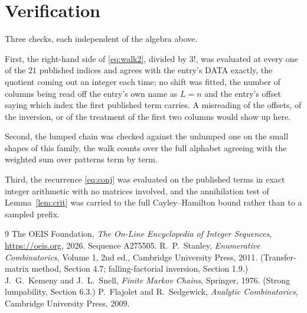 \documentclass[11pt,a4paper]{article}
\theoremstyle{plain}
\theoremstyle{definition}
\begin{document}
\section{Verification}

Three checks, each independent of the algebra above.

First, the right-hand side of \eqref{eq:walk2}, divided by $3!$, was evaluated at every
one of the $21$ published indices and agrees with the entry's DATA exactly, the quotient
coming out an integer each time; no shift was fitted, the number of columns being read off the
entry's own name as $L=n$ and the entry's offset saying which index the first published
term carries. A misreading of the offsets, of the inversion, or of the treatment of the first
two columns would show up here.

Second, the lumped chain was checked against the unlumped one on the small shapes of this
family, the walk counts over the full alphabet agreeing with the weighted sum over patterns
term by term.

Third, the recurrence \eqref{eq:conj} was evaluated on the published terms in exact integer
arithmetic with no matrices involved, and the annihilation test of Lemma~\ref{lem:crit} was
carried to the full Cayley--Hamilton bound rather than to a sampled prefix.

\begin{thebibliography}{9}
 The OEIS Foundation, \emph{The On-Line Encyclopedia of Integer
Sequences}, \url{https://oeis.org}, 2026. Sequence A275505.
 R.~P.~Stanley, \emph{Enumerative Combinatorics}, Volume 1, 2nd ed.,
Cambridge University Press, 2011. (Transfer-matrix method, Section 4.7; falling-factorial
inversion, Section 1.9.)
 J.~G.~Kemeny and J.~L.~Snell, \emph{Finite Markov Chains}, Springer,
1976. (Strong lumpability, Section 6.3.)
 P.~Flajolet and R.~Sedgewick, \emph{Analytic Combinatorics}, Cambridge
University Press, 2009.
\end{thebibliography}
\end{document}
